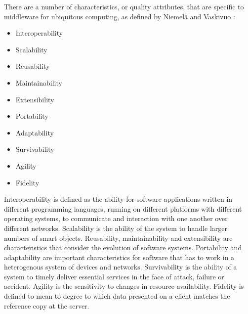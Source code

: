 There are a number of characteristics, or quality attributes, that are specific to middleware for ubiquitous computing, as defined by Niemel\"a and Vaskivuo \cite{Niemela2004}:

\begin{itemize}
	\item Interoperability
	\item Scalability 
	\item Reusability
	\item Maintainability
	\item Extensibility
	\item Portability
	\item Adaptability
	\item Survivability
	\item Agility
	\item Fidelity
\end{itemize} 

Interoperability is defined as the ability for software applications written in different programming languages, running on different platforms with different operating systems, to communicate and interaction with one another over different networks. Scalability is the ability of the system to handle larger numbers of smart objects. Re\-us\-a\-bility, maintainability and extensibility are characteristics that consider the evolution of software systems. Portability and adaptability are important characteristics for software that has to work in a heterogenous system of devices and networks. Survivability is the ability of a system to timely deliver essential services in the face of attack, failure or accident. Agility is the sensitivity to changes in resource availability. Fidelity is defined to mean to degree to which data presented on a client matches the reference copy at the server.

